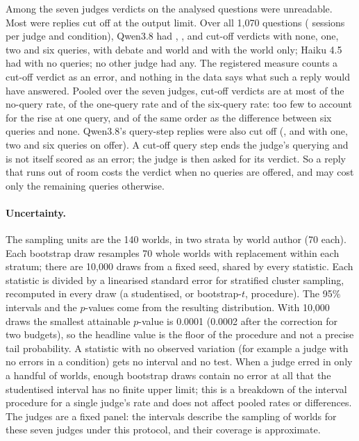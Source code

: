 Among the seven judges \nUnreadable{} verdicts on the analysed questions were unreadable. Most were replies cut off
at the output limit. Over all 1,070 questions (\nCutSessionsPerCell{} sessions per judge and condition), Qwen3.8 had
\qwenCutZero, \qwenCutOne, \qwenCutTwo{} and \qwenCutSix{} cut-off verdicts with none, one, two and six queries,
\qwenCutDebWorld{} with debate and world and \qwenCutWorld{} with the world only; Haiku 4.5 had \haikuCutZero{} with
no queries; no other judge had any. The registered measure counts a cut-off verdict as an error, and nothing in the
data says what such a reply would have answered. Pooled over the seven judges, cut-off verdicts are at most
\cutPooledZero{} \pp{} of the no-query rate, \cutPooledOne{} of the one-query rate and \cutPooledSix{} of the
six-query rate: too few to account for the rise at one query, and of the same order as the difference between six
queries and none. Qwen3.8's query-step replies were also cut off (\qwenStepCutOne, \qwenStepCutTwo{} and
\qwenStepCutSix{} with one, two and six queries on offer). A cut-off query step ends the judge's querying and is not
itself scored as an error; the judge is then asked for its verdict. So a reply that runs out of room costs the
verdict when no queries are offered, and may cost only the remaining queries otherwise.

\paragraph{Uncertainty.} The sampling units are the 140 worlds, in two strata by world author (70 each). Each
bootstrap draw resamples 70 whole worlds with replacement within each stratum; there are 10,000 draws from a fixed
seed, shared by every statistic. Each statistic is divided by a linearised standard error for stratified cluster
sampling, recomputed in every draw (a studentised, or bootstrap-$t$, procedure). The 95\% intervals and the
$p$-values come from the resulting distribution. With 10,000 draws the smallest attainable $p$-value is 0.0001
(0.0002 after the correction for two budgets), so the headline value is the floor of the procedure and not a precise
tail probability. A statistic with no observed variation (for example a judge with no errors in a condition) gets no
interval and no test. When a judge erred in only a handful of worlds, enough bootstrap draws contain no error at all
that the studentised interval has no finite upper limit; this is a breakdown of the interval procedure for a single
judge's rate and does not affect pooled rates or differences. The judges are a fixed panel: the intervals describe
the sampling of worlds for these seven judges under this protocol, and their coverage is approximate.


